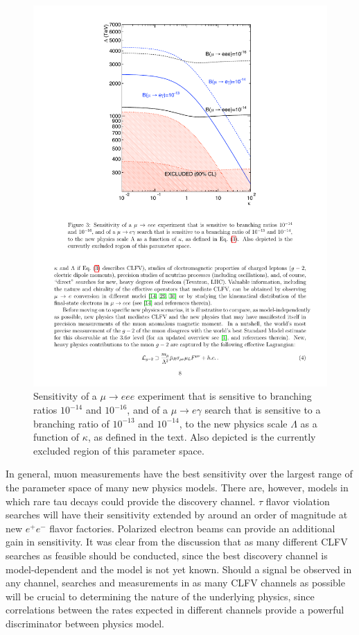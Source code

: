 \documentclass{tcibook}
\begin{document}
\begin{figure}[ht]
\begin{minipage}[b]{0.48\linewidth}
    \includegraphics[trim = 45mm 130mm 50mm 10mm, clip, width=\linewidth]{Page8.pdf}
  \caption{{Sensitivity of a $\mu \to eee$ experiment that is sensitive to branching ratios $10^{−14}$ and 
$10^{−16}$, and of a $\mu \to e \gamma$ search that is sensitive to a branching ratio of $10^{−13}$ and $10^{−14}$, to the new 
physics scale $\Lambda$ as a function of $\kappa$, as defined in the text.  Also depicted is the
currently excluded region of this parameter space.
}}
  \label{fig:cl:p8}
\end{minipage}
\end{figure}

In general, muon measurements have the best
sensitivity over the largest range of the parameter space of many new
physics models. There are, however, models
in which  rare tau decays could provide the discovery
channel. $\tau$ flavor violation searches will have their sensitivity extended by around an order of magnitude at new $e^+e^-$ flavor factories. Polarized electron beams can provide an additional gain in sensitivity.  It was clear from the discussion that as many different
CLFV searches as feasible should be conducted, since the best discovery
channel is model-dependent and the model is not yet known.  Should a
signal be observed in any channel, searches and measurements in as
many CLFV channels as possible will be crucial to determining the nature
of the underlying physics, since correlations between the rates
expected in different channels provide a powerful discriminator between
physics model.
\end{document}
